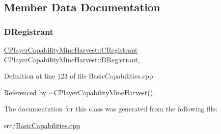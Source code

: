 \subsection{Member Data Documentation}
\hypertarget{classCPlayerCapabilityMineHarvest_aa493df2fd0bbae27ce1b7c4e2250a28c}{}\label{classCPlayerCapabilityMineHarvest_aa493df2fd0bbae27ce1b7c4e2250a28c} 
\subsubsection{\texorpdfstring{D\+Registrant}{DRegistrant}}
{\footnotesize\ttfamily \hyperlink{classCPlayerCapabilityMineHarvest_1_1CRegistrant}{C\+Player\+Capability\+Mine\+Harvest\+::\+C\+Registrant} C\+Player\+Capability\+Mine\+Harvest\+::\+D\+Registrant\hspace{0.3cm}{\ttfamily [static]}, {\ttfamily [protected]}}



Definition at line 123 of file Basic\+Capabilities.\+cpp.



Referenced by $\sim$\+C\+Player\+Capability\+Mine\+Harvest().



The documentation for this class was generated from the following file\+:\begin{DoxyCompactItemize}
\item 
src/\hyperlink{BasicCapabilities_8cpp}{Basic\+Capabilities.\+cpp}\end{DoxyCompactItemize}
